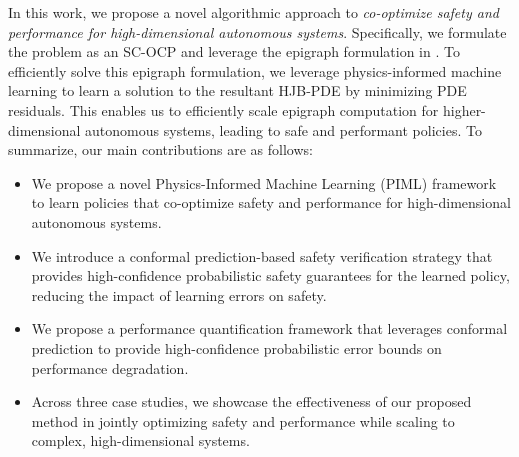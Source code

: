 In this work, we propose a novel algorithmic approach to \textit{co-optimize safety and performance for high-dimensional autonomous systems}.
Specifically, we formulate the problem as an SC-OCP and leverage the epigraph formulation in \cite{altarovici2013general}. To efficiently solve this epigraph formulation, we leverage physics-informed machine learning \cite{RAISSI2019686, li2022physicsinformed} to learn a solution to the resultant HJB-PDE by minimizing PDE residuals. This enables us to efficiently scale epigraph computation for higher-dimensional autonomous systems, leading to safe and performant policies. To summarize, our main contributions are as follows:  
% 
\begin{itemize}  
    \item We propose a novel Physics-Informed Machine Learning (PIML) framework to learn policies that co-optimize safety and performance for high-dimensional autonomous systems.  
    \item We introduce a conformal prediction-based safety verification strategy that provides high-confidence probabilistic safety guarantees for the learned policy, reducing the impact of learning errors on safety.
    \item We propose a performance quantification framework that leverages conformal prediction to provide high-confidence probabilistic error bounds on performance degradation.
    \item Across three case studies, we showcase the effectiveness of our proposed method in jointly optimizing safety and performance while scaling to complex, high-dimensional systems.  
\end{itemize}  
% 
% 
% 
% 

\nocite{so2023solving, tayal2024semi}

